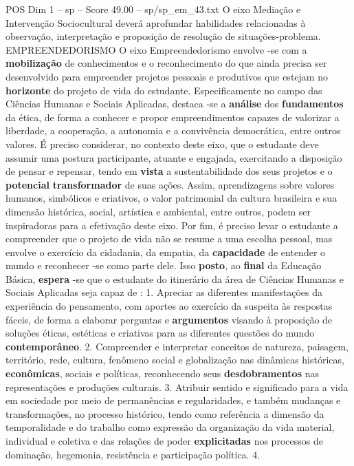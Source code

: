 \begin{textsample}{POS Dim 1 – sp – Score 49.00 – sp/sp\_em\_43.txt}
O eixo Mediação e Intervenção Sociocultural deverá aprofundar habilidades relacionadas à observação, interpretação e proposição de resolução de situações-problema.
EMPREENDEDORISMO O eixo Empreendedorismo envolve -se com a \textbf{mobilização} de conhecimentos e o reconhecimento do que ainda precisa ser desenvolvido para empreender projetos pessoais e produtivos que estejam no \textbf{horizonte} do projeto de vida do estudante.
Especificamente no campo das Ciências Humanas e Sociais Aplicadas, destaca -se a \textbf{análise} dos \textbf{fundamentos} da ética, de forma a conhecer e propor empreendimentos capazes de valorizar a liberdade, a cooperação, a autonomia e a convivência democrática, entre outros valores.
É preciso considerar, no contexto deste eixo, que o estudante deve assumir uma postura participante, atuante e engajada, exercitando a disposição de pensar e repensar, tendo em \textbf{vista} a sustentabilidade dos seus projetos e o \textbf{potencial} \textbf{transformador} de suas ações.
Assim, aprendizagens sobre valores humanos, simbólicos e criativos, o valor patrimonial da cultura brasileira e sua dimensão histórica, social, artística e ambiental, entre outros, podem ser inspiradoras para a efetivação deste eixo.
Por fim, é preciso levar o estudante a compreender que o projeto de vida não se resume a uma escolha pessoal, mas envolve o exercício da cidadania, da empatia, da \textbf{capacidade} de entender o mundo e reconhecer -se como parte dele.
Isso \textbf{posto}, ao \textbf{final} da Educação Básica, \textbf{espera} -se que o estudante do itinerário da área de Ciências Humanas e Sociais Aplicadas seja capaz de : 1.
Apreciar as diferentes manifestações da experiência do pensamento, com aportes ao exercício da suspeita às respostas fáceis, de forma a elaborar perguntas e \textbf{argumentos} visando à proposição de soluções éticas, estéticas e criativas para as diferentes questões do mundo \textbf{contemporâneo}. 2.
Compreender e interpretar conceitos de natureza, paisagem, território, rede, cultura, fenômeno social e globalização nas dinâmicas históricas, \textbf{econômicas}, sociais e políticas, reconhecendo seus \textbf{desdobramentos} nas representações e produções culturais. 3.
Atribuir sentido e significado para a vida em sociedade por meio de permanências e regularidades, e também mudanças e transformações, no processo histórico, tendo como referência a dimensão da temporalidade e do trabalho como expressão da organização da vida material, individual e coletiva e das relações de poder \textbf{explicitadas} nos processos de dominação, hegemonia, resistência e participação política. 4.

\end{textsample}
